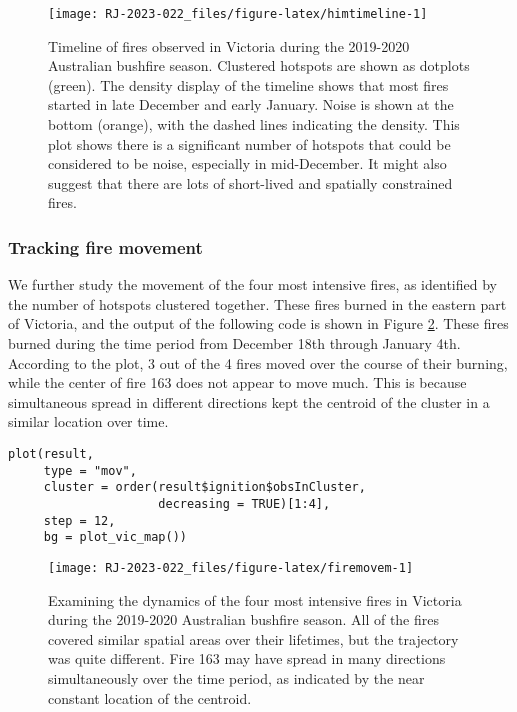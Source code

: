 \begin{figure}

{\centering \texttt{[image: RJ-2023-022\_files/figure-latex/himtimeline-1]} 

}

\caption{Timeline of fires observed in Victoria during the 2019-2020 Australian bushfire season. Clustered hotspots are shown as dotplots (green). The density display of the timeline shows that most fires started in late December and early January. Noise is shown at the bottom (orange), with the dashed lines indicating the density. This plot shows there is a significant number of hotspots that could be considered to be noise, especially in mid-December. It might also suggest that there are lots of short-lived and spatially constrained fires.}\label{fig:himtimeline}
\end{figure}

\hypertarget{tracking-fire-movement}{%
\subsubsection{Tracking fire movement}\label{tracking-fire-movement}}

We further study the movement of the four most intensive fires, as identified by the number of hotspots clustered together. These fires burned in the eastern part of Victoria, and the output of the following code is shown in Figure \ref{fig:firemovem}. These fires burned during the time period from December 18th through January 4th. According to the plot, 3 out of the 4 fires moved over the course of their burning, while the center of fire 163 does not appear to move much. This is because simultaneous spread in different directions kept the centroid of the cluster in a similar location over time.

\begin{verbatim}
plot(result, 
     type = "mov", 
     cluster = order(result$ignition$obsInCluster,
                     decreasing = TRUE)[1:4], 
     step = 12, 
     bg = plot_vic_map())
\end{verbatim}

\begin{figure}

{\centering \texttt{[image: RJ-2023-022\_files/figure-latex/firemovem-1]} 

}

\caption{Examining the dynamics of the four most intensive fires in Victoria during the 2019-2020 Australian bushfire season. All of the fires covered similar spatial areas over their lifetimes, but the trajectory was quite different. Fire 163 may have spread in many directions simultaneously over the time period, as indicated by the near constant location of the centroid.}\label{fig:firemovem}
\end{figure}

